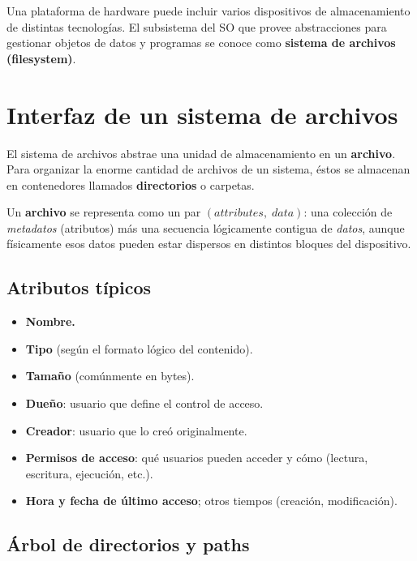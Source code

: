 \documentclass[11pt,a4paper]{article}
\begin{document}
Una plataforma de hardware puede incluir varios dispositivos de
almacenamiento de distintas tecnologías. El subsistema del SO que
provee abstracciones para gestionar objetos de datos y programas se
conoce como \textbf{sistema de archivos (filesystem)}.

\section{Interfaz de un sistema de archivos}

El sistema de archivos abstrae una unidad de almacenamiento en un
\textbf{archivo}. Para organizar la enorme cantidad de archivos de un
sistema, éstos se almacenan en contenedores llamados
\textbf{directorios} o carpetas.

\begin{definicion}
Un \textbf{archivo} se representa como un par
$(\textit{attributes},\;\textit{data})$: una colección de
\emph{metadatos} (atributos) más una secuencia lógicamente contigua de
\emph{datos}, aunque físicamente esos datos pueden estar dispersos en
distintos bloques del dispositivo.
\end{definicion}

\subsection{Atributos típicos}

\begin{itemize}[leftmargin=*,nosep]
    \item \textbf{Nombre.}
    \item \textbf{Tipo} (según el formato lógico del contenido).
    \item \textbf{Tamaño} (comúnmente en bytes).
    \item \textbf{Dueño}: usuario que define el control de acceso.
    \item \textbf{Creador}: usuario que lo creó originalmente.
    \item \textbf{Permisos de acceso}: qué usuarios pueden acceder y
        cómo (lectura, escritura, ejecución, etc.).
    \item \textbf{Hora y fecha de último acceso}; otros tiempos
        (creación, modificación).
\end{itemize}

\subsection{Árbol de directorios y paths}
\end{document}

